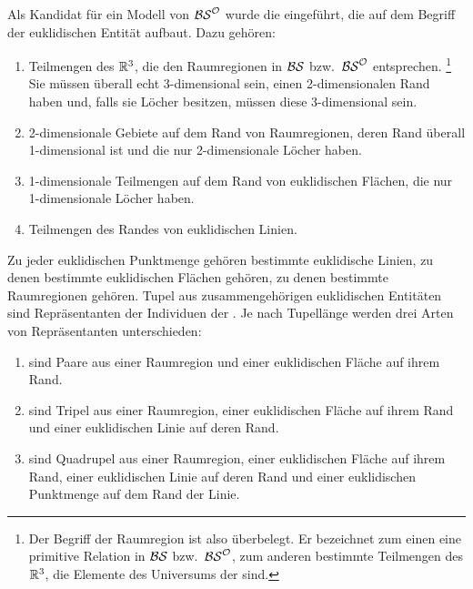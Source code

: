     Als
    Kandidat für ein Modell von $\mathcal{BS}^{\mathcal{O}}$ wurde die \strukt eingeführt, die auf dem Begriff der euklidischen Entität aufbaut.
    Dazu gehören:
    \begin{enumerate}
        \item {} Teilmengen des $\mathbb{R}^3$, die den Raumregionen in $\mathcal{BS}$ bzw.\ $\mathcal{BS}^{\mathcal{O}}$ entsprechen.%
        \footnote{Der Begriff der Raumregion ist also überbelegt. Er bezeichnet zum einen eine primitive Relation in $\mathcal{BS}$ bzw.\ $\mathcal{BS}^{\mathcal{O}}$, zum anderen bestimmte Teilmengen des $\mathbb{R}^3$, die Elemente des Universums der \strukt sind.}
        Sie müssen überall echt 3-di\-men\-sio\-nal sein, einen 2-dimensionalen Rand haben und, falls sie Löcher besitzen, müssen diese 3-dimensional sein.
        \item {} 2-dimensionale Gebiete auf dem Rand von %
        Raumregionen, deren Rand überall 1-dimensional ist und die nur 2-dimensionale Löcher haben.
        \item {} 1-dimensionale Teilmengen auf dem Rand von euklidischen Flächen, die nur 1-dimensionale Löcher haben.
        \item {} Teilmengen des Randes von euklidischen Linien.
    \end{enumerate}
    Zu
    jeder euklidischen Punktmenge gehören bestimmte euklidische Linien, zu denen bestimmte euklidischen Flächen gehören, zu denen bestimmte Raumregionen gehören.
    Tupel aus zusammengehörigen euklidischen Entitäten sind Repräsentanten der Individuen der \strukt.
    Je nach Tupellänge werden drei Arten von Repräsentanten unterschieden:
    \begin{enumerate}
        \item {} 
            sind Paare aus einer Raumregion und einer euklidischen Fläche auf ihrem Rand.
        \item {}
            sind Tripel aus einer Raumregion, einer euklidischen Fläche auf ihrem Rand und einer euklidischen Linie auf deren Rand.
        \item {}
            sind Quadrupel aus einer Raumregion, einer euklidischen Fläche auf ihrem Rand, einer euklidischen Linie auf deren Rand und einer euklidischen Punktmenge auf dem Rand der Linie.%
    \end{enumerate}

